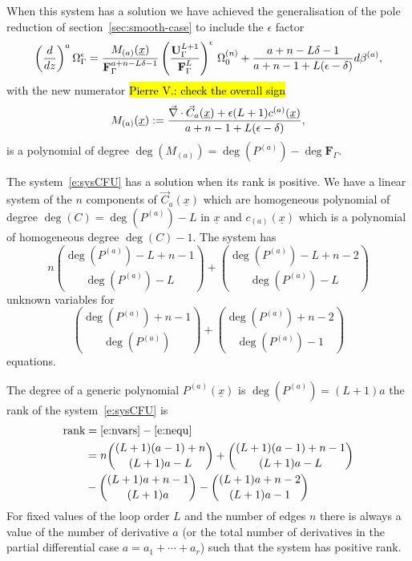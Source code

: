 \documentclass[a4paper,12pt]{article}
\numberwithin{equation}{section}
\numberwithin{figure}{section}
\newcommand{\pvnote}[1]{\sethlcolor{bubblegum} \protect\hl{Pierre V.: #1} \sethlcolor{yellow}}
\begin{document}
When this system has a solution we have achieved the generalisation of the pole reduction of
section~\ref{sec:smooth-case} to include the $\epsilon$ factor
\begin{equation}
 \left(d\over dz\right)^a
 \Omega_\Gamma^\epsilon= {
    M_{(a)}(\underline x)
    \over   \textbf{F}_\Gamma^{a+n-L\delta-1}}\left(\textbf{U}_\Gamma^{L+1}\over
    \textbf{F}_\Gamma^L \right)^\epsilon\, \Omega_0^{(n)}+{ a+n-L\delta-1
    \over    a+n-1+L(\epsilon-\delta) } d\beta^{(a)},
\end{equation}
with the new  numerator  \pvnote{check the overall sign}
\begin{equation}\label{e:Mdef}
    M_{(a)}(\underline x):=  { \vec\nabla\cdot \vec C_{a}
     (\underline x)+\epsilon (L+1) c^{(a)}(\underline x)\over   a+n-1+L(\epsilon-\delta) },
 \end{equation}
 is a polynomial of degree $\deg(M_{(a)})=\deg (P^{(a)})-\deg  \textbf{F}_\Gamma$.

The system~\eqref{e:sysCFU} has a solution when its rank is positive.
We have a linear system of the $n$ components of $\vec C_a(\underline
x) $ which are homogeneous polynomial of degree $\deg(C)=\deg(P^{(a)})-L $ in
$\underline x$ and  $c_{(a)}(\underline x) $ which is a polynomial of
homogeneous degree $\deg(C)-1$.   The system has
\begin{equation}\label{e:nvars}
n \binom{\deg(P^{(a)})-L+n-1}{\deg(P^{(a)})-L}+\binom{\deg(P^{(a)})-L+n-2}{\deg(P^{(a)})-L}
\end{equation} unknown variables for
\begin{equation}\label{e:nequ}
\binom{\deg(P^{(a)})+n-1}{\deg(P^{(a)})}+\binom{\deg(P^{(a)})+n-2}{\deg(P^{(a)})-1}
\end{equation}
equations.


The degree of a generic polynomial $P^{(a)}(\underline x)$ is $\deg(
P^{(a)})=(L+1)a$ 
 the rank of the system~\eqref{e:sysCFU} is
  \begin{align}
    \label{e:Rank}
    \textrm{rank}&=\eqref{e:nvars}-\eqref{e:nequ}\\
\nonumber    &=n \binom{(L+1)(a-1)+n
               }{(L+1)a-L}+\binom{(L+1)(a-1)+n-1}{(L+1)a-L}\cr
             \nonumber    &
                              -\binom{(L+1)a+n-1}{(L+1)a}-\binom{(L+1)a+n-2}{(L+1)a-1}
  \end{align}
For fixed values of the loop order $L$
and the number of edges $n$ there is always a value of the
number of derivative $a$ (or the total number of derivatives in the
partial differential case $a=a_1+\cdots+a_r$) such that the system has
positive rank.
\end{document}
